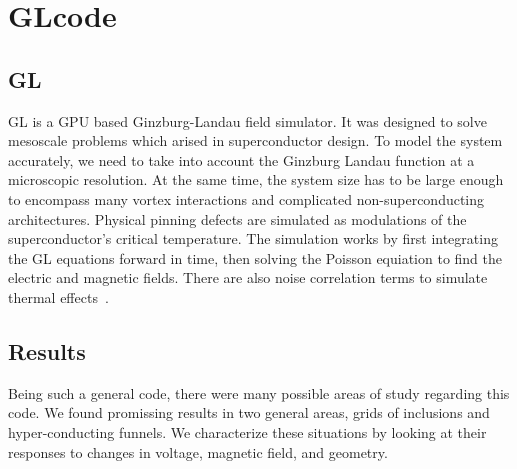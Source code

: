 \chapter{GLcode}          %
\label{codechap}

\section{GL}
GL is a GPU based Ginzburg-Landau field simulator. It was designed to solve mesoscale problems which arised in superconductor design. To model the system accurately, we need to take into account the Ginzburg Landau function at a microscopic resolution. At the same time, the system size has to be large enough to encompass many vortex interactions and complicated non-superconducting architectures. Physical pinning defects are simulated as modulations of the superconductor's critical temperature. The simulation works by first integrating the GL equations forward in time, then solving the Poisson equiation to find the electric and magnetic fields. There are also noise correlation terms to simulate thermal effects~\cite{Sadovskyy14}.

\section{Results}
Being such a general code, there were many possible areas of study regarding this code. We found promissing results in two general areas, grids of inclusions and hyper-conducting funnels. We characterize these situations by looking at their responses to changes in voltage, magnetic field, and geometry.

